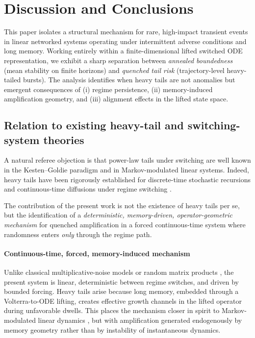 \documentclass[12pt,a4paper]{article}
\theoremstyle{definition}
\theoremstyle{remark}
\begin{document}
\section{Discussion and Conclusions}
\label{sec:discussion}

This paper isolates a structural mechanism for rare, high-impact transient events in
linear networked systems operating under intermittent adverse conditions and long memory.
Working entirely within a finite-dimensional lifted switched ODE representation,
we exhibit a sharp separation between \emph{annealed boundedness}
(mean stability on finite horizons)
and \emph{quenched tail risk}
(trajectory-level heavy-tailed bursts).
The analysis identifies when heavy tails are not anomalies but emergent consequences of
(i) regime persistence,
(ii) memory-induced amplification geometry,
and (iii) alignment effects in the lifted state space.

\subsection*{Relation to existing heavy-tail and switching-system theories}

A natural referee objection is that power-law tails under switching are well known in the
Kesten--Goldie paradigm and in Markov-modulated linear systems.
Indeed, heavy tails have been rigorously established for discrete-time stochastic
recursions and continuous-time diffusions under regime switching
\cite{kesten1973,goldie1991,buraczewski2016,desaporta2005,deSaporta2004tails}.

The contribution of the present work is not the existence of heavy tails per se,
but the identification of a \emph{deterministic, memory-driven, operator-geometric mechanism}
for quenched amplification in a forced continuous-time system where randomness enters
\emph{only} through the regime path.

\paragraph{Continuous-time, forced, memory-induced mechanism}
Unlike classical multiplicative-noise models or random matrix products
\cite{kesten1973,goldie1991,buraczewski2016},
the present system is linear, deterministic between regime switches,
and driven by bounded forcing.
Heavy tails arise because long memory, embedded through a Volterra-to-ODE lifting,
creates effective growth channels in the lifted operator during unfavorable dwells.
This places the mechanism closer in spirit to Markov-modulated linear dynamics
\cite{deSaporta2004tails,desaporta2005},
but with amplification generated endogenously by memory geometry rather than by
instability of instantaneous dynamics.
\end{document}
